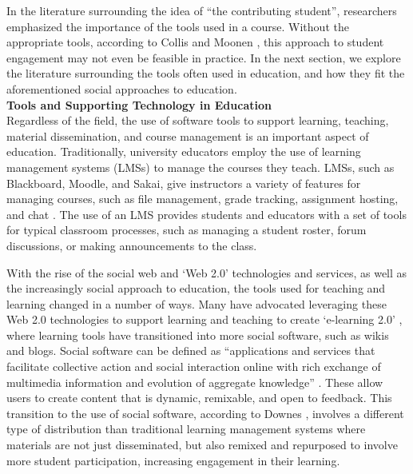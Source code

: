 In the literature surrounding the idea of ``the contributing student'', researchers emphasized the importance of the tools used in a course. Without the appropriate tools, according to Collis and Moonen \cite{collis2006contributing}, this approach to student engagement may not even be feasible in practice. In the next section, we explore the literature surrounding the tools often used in education, and how they fit the aforementioned social approaches to education. \\

\textbf{Tools and Supporting Technology in Education} \\
Regardless of the field, the use of software tools to support learning, teaching, material dissemination, and course management is an important aspect of education. Traditionally, university educators employ the use of learning management systems (LMSs) to manage the courses they teach. LMSs, such as Blackboard, Moodle, and Sakai, give instructors a variety of features for managing courses, such as file management, grade tracking, assignment hosting, and chat \cite{kumar2011comparative}. The use of an LMS provides students and educators with a set of tools for typical classroom processes, such as managing a student roster, forum discussions, or making announcements to the class.

With the rise of the social web and ‘Web 2.0’ technologies and services, as well as the increasingly social approach to education, the tools used for teaching and learning changed in a number of ways. Many have advocated leveraging these Web 2.0 technologies to support learning and teaching to create ‘e-learning 2.0’ \cite{downes2005feature}, where learning tools have transitioned into more social software, such as wikis and blogs. Social software can be defined as ``applications and services that facilitate collective action and social interaction online with rich exchange of multimedia information and evolution of aggregate knowledge'' \cite{parameswaran2007social}. These allow users to create content that is dynamic, remixable, and open to feedback. This transition to the use of social software, according to Downes \cite{downes2005feature}, involves a different type of distribution than traditional learning management systems where materials are not just disseminated, but also remixed and repurposed to involve more student participation, increasing engagement in their learning.

